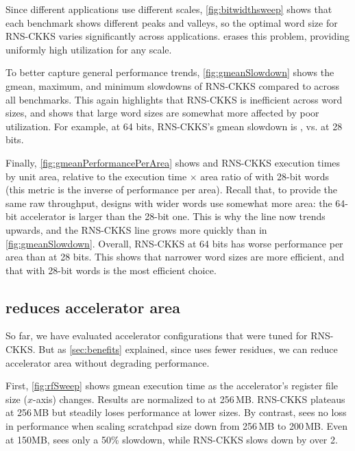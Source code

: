 Since different applications use different scales, \autoref{fig:bitwidthsweep}
shows that each benchmark shows different peaks and valleys, so the optimal
word size for RNS-CKKS varies significantly across applications.
\name erases this problem, providing uniformly high utilization for any scale.

\figGmeanSlowdown

To better capture general performance trends, \autoref{fig:gmeanSlowdown} shows
the gmean, maximum, and minimum slowdowns of RNS-CKKS compared to \name across
all benchmarks.
This again highlights that RNS-CKKS is inefficient across word sizes, and
shows that large word sizes are somewhat more affected by poor utilization.
For example, at 64 bits, RNS-CKKS's gmean slowdown is
,
vs. 
at 28 bits.

\figGmeanPerformancePerArea

Finally, \autoref{fig:gmeanPerformancePerArea} shows \name and RNS-CKKS
execution times by unit area, relative to the execution time $\times$ area ratio
of \name with 28-bit words (this metric is the inverse of performance per area).
Recall that, to provide the same raw throughput, designs with wider words use somewhat more area:
the 64-bit accelerator is  larger than the 28-bit one.
This is why the \name line now trends upwards, and the RNS-CKKS line grows more quickly than in \autoref{fig:gmeanSlowdown}.
Overall, RNS-CKKS at 64 bits has  worse performance per area than \name at 28 bits.
This shows that narrower word sizes are more efficient, and that
\name with 28-bit words is the most efficient choice.

\subsection{\name reduces accelerator area}

So far, we have evaluated accelerator configurations that were tuned for RNS-CKKS.
But as \autoref{sec:benefits} explained, since \name uses fewer residues,
we can reduce accelerator area without degrading performance.

First, \autoref{fig:rfSweep} shows gmean execution time as the
accelerator's register file size ($x$-axis) changes.
Results are normalized to \name at 256\,MB.
RNS-CKKS plateaus at 256\,MB but steadily loses performance at lower sizes.
By contrast, \name sees no loss in performance when scaling scratchpad size down
from 256\,MB to 200\,MB.
Even at 150\;MB, \name sees only a 50\% slowdown, while RNS-CKKS slows down
by over 2\x.

